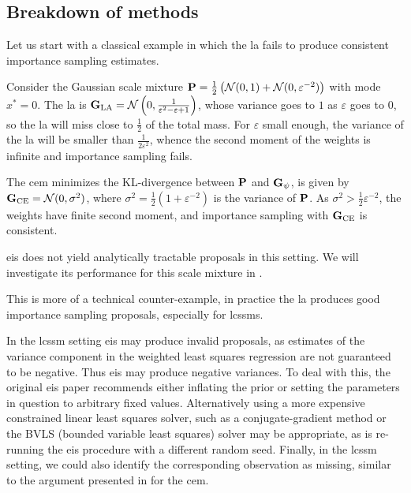 \subsection{Breakdown of methods}

Let us start with a classical example in which the \gls{la} fails to produce consistent importance sampling estimates. 
\begin{example}
  \label{ex:la_failure}
  Consider the Gaussian scale mixture $\P = \frac{1}{2} \left(\mathcal N (0,1) + \mathcal N(0, \varepsilon^{-2})\right)$ with mode $x^{\ast}=0$. 
  The \gls{la} is $\G_{\text{LA}} = \mathcal N \left( 0, \frac{1}{\varepsilon^{2} - \varepsilon + 1} \right)$, whose variance goes to $1$ as $\varepsilon$ goes to $0$, so the \gls{la} will miss close to $\frac 1 2$ of the total mass.
  For $\varepsilon$ small enough, the variance of the \gls{la} will be smaller than $\frac{1}{2\varepsilon^{2}}$, whence the second moment of the weights is infinite and importance sampling fails.

  The \gls{cem} minimizes the KL-divergence between $\P$ and $\G_{\psi}$, is given by $\G_{\text{CE}} = \mathcal N (0, \sigma^{2})$, where $\sigma^{2} = \frac{1}{2}\left( 1 + \varepsilon^{-2} \right)$ is the variance of $\P$.
  As $\sigma^{2} > \frac{1}{2}\varepsilon^{-2}$, the weights have finite second moment, and importance sampling with $\G_{\ce}$ is consistent.

  \Gls{eis} does not yield analytically tractable proposals in this setting. We will investigate its performance for this scale mixture in .
\end{example}

This is more of a technical counter-example, in practice the \gls{la} produces good importance sampling proposals, especially for \glspl{lcssm}. 

In the \gls{lcssm} setting \gls{eis} may produce invalid proposals, as estimates of the variance component in the weighted least squares regression are not guaranteed to be negative. Thus \gls{eis} may produce negative variances. To deal with this, the original \gls{eis} paper \cite[Section 3.2]{Richard2007Efficient} recommends either inflating the prior or setting the parameters in question to arbitrary fixed values. Alternatively using a more expensive constrained linear least squares solver, such as a conjugate-gradient method \cite{Branch1999Subspace} or the BVLS (bounded variable least squares) solver \cite{Stark1995Boundedvariable} may be appropriate, as is re-running the \gls{eis} procedure with a different random seed. Finally, in the \gls{lcssm} setting, we could also identify the corresponding observation as missing, similar to the argument presented in  for the \gls{cem}. 

